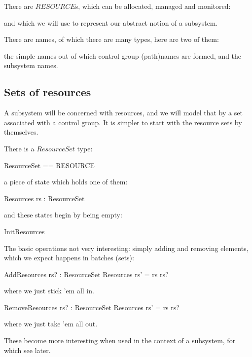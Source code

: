 \documentclass[a4paper,twoside,12pt]{article}
\begin{document}
There are $RESOURCE$s, which can be allocated, managed and monitored:
\begin{zed}
[RESOURCE]
\end{zed}
and which we will use to represent our abstract notion of a subsystem.

There are names, of which there are many types, here are two of them:
\begin{zed}
\end{zed}
the simple names out of which control group (path)names are formed, and the subsystem names.

\subsection{Sets of resources}

A subsystem will be concerned with resources, and we will model that by a set associated
with a control group. It is simpler to start with the resource sets by themselves.

There is a $ResourceSet$ type:
\begin{zed}
ResourceSet == \finset RESOURCE
\end{zed}
a piece of state which holds one of them:
\begin{schema}{Resources}
rs : ResourceSet
\end{schema}
and these states begin by being empty:
\begin{zed}
InitResources 
\end{zed}

The basic operations not very interesting: simply adding and removing elements, which we expect happens
in batches (sets):

\begin{schema}{AddResources}
rs? : ResourceSet
\also
\Delta Resources
\where
rs' = rs \cup rs?
\end{schema}
where we just stick 'em all in.

\begin{schema}{RemoveResources}
rs? : ResourceSet
\also
\Delta Resources
\where
rs' = rs \setminus rs?
\end{schema}
where we just take 'em all out.

These become more interesting when used in the context of a subsystem, for which see later.

\end{document}
